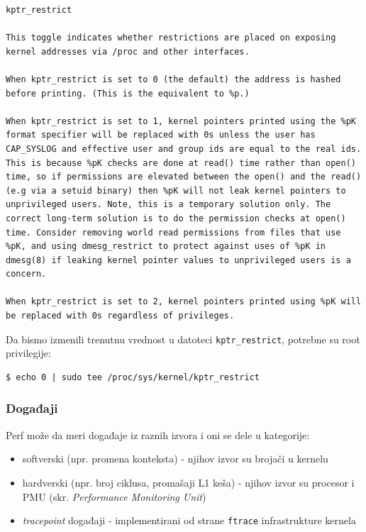 \begin{verbatim}
kptr_restrict

This toggle indicates whether restrictions are placed on exposing kernel addresses via /proc and other interfaces.

When kptr_restrict is set to 0 (the default) the address is hashed before printing. (This is the equivalent to %p.)

When kptr_restrict is set to 1, kernel pointers printed using the %pK format specifier will be replaced with 0s unless the user has CAP_SYSLOG and effective user and group ids are equal to the real ids. This is because %pK checks are done at read() time rather than open() time, so if permissions are elevated between the open() and the read() (e.g via a setuid binary) then %pK will not leak kernel pointers to unprivileged users. Note, this is a temporary solution only. The correct long-term solution is to do the permission checks at open() time. Consider removing world read permissions from files that use %pK, and using dmesg_restrict to protect against uses of %pK in dmesg(8) if leaking kernel pointer values to unprivileged users is a concern.

When kptr_restrict is set to 2, kernel pointers printed using %pK will be replaced with 0s regardless of privileges.
\end{verbatim}

Da bismo izmenili trenutnu vrednost u datoteci \texttt{kptr\_restrict}, potrebne su root privilegije:

\begin{verbatim}
$ echo 0 | sudo tee /proc/sys/kernel/kptr_restrict
\end{verbatim}

\subsubsection{Događaji}\label{dogaux111aji}

Perf može da meri događaje iz raznih izvora i oni se dele u kategorije:

\begin{itemize}
\tightlist
\item
  softverski (npr. promena konteksta) - njihov izvor su brojači u kernelu
\item
  hardverski (npr. broj ciklusa, promašaji L1 keša) - njihov izvor su procesor i PMU (skr. \emph{Performance Monitoring Unit})
\item
  \emph{tracepoint} događaji - implementirani od strane \texttt{ftrace} infrastrukture kernela
\end{itemize}

